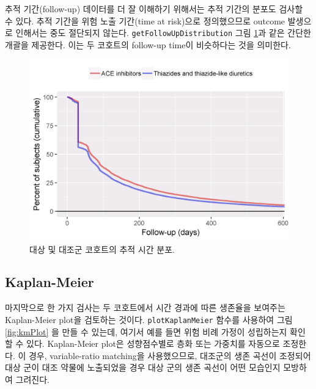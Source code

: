 \documentclass[11pt]{book}
\theoremstyle{definition}
\theoremstyle{definition}
\theoremstyle{definition}
\theoremstyle{remark}
\begin{document}
추적 기간(follow-up) 데이터를 더 잘 이해하기 위해서는 추적 기간의 분포도
검사할 수 있다. 추적 기간을 위험 노출 기간(time at risk)으로
정의했으므로 outcome 발생으로 인해서는 중도 절단되지 않는다.
\texttt{getFollowUpDistribution} 그림 \ref{fig:followUp}과 같은 간단한
개괄을 제공한다. 이는 두 코호트의 follow-up time이 비슷하다는 것을
의미한다.

\begin{figure}

{\centering \includegraphics[width=0.8\linewidth]{images/PopulationLevelEstimation/followUp} 

}

\caption{대상 및 대조군 코호트의 추적 시간 분포.}\label{fig:followUp}
\end{figure}

\subsection{Kaplan-Meier}\label{kaplan-meier}

마지막으로 한 가지 검사는 두 코호트에서 시간 경과에 따른 생존율을
보여주는 Kaplan-Meier plot을 검토하는 것이다. \texttt{plotKaplanMeier}
함수를 사용하여 그림 \ref{fig:kmPlot} 을 만들 수 있는데, 여기서 예를
들면 위험 비례 가정이 성립하는지 확인할 수 있다. Kaplan-Meier plot은
성향점수별로 층화 또는 가중치를 자동으로 조정한다. 이 경우,
variable-ratio matching을 사용했으므로, 대조군의 생존 곡선이 조정되어
대상 군이 대조 약물에 노출되었을 경우 대상 군의 생존 곡선이 어떤
모습인지 모방하여 그려진다. 
\end{document}
